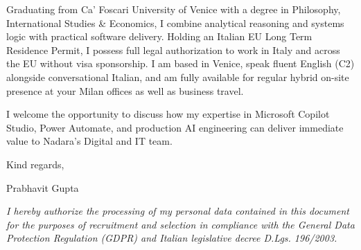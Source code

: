 \documentclass[10.5pt,a4paper]{article}
\begin{document}
Graduating from Ca' Foscari University of Venice with a degree in Philosophy, International Studies \& Economics, I combine analytical reasoning and systems logic with practical software delivery. Holding an Italian EU Long Term Residence Permit, I possess full legal authorization to work in Italy and across the EU without visa sponsorship. I am based in Venice, speak fluent English (C2) alongside conversational Italian, and am fully available for regular hybrid on-site presence at your Milan offices as well as business travel.

I welcome the opportunity to discuss how my expertise in Microsoft Copilot Studio, Power Automate, and production AI engineering can deliver immediate value to Nadara's Digital and IT team.

Kind regards,

Prabhavit Gupta

\vspace{0.4em}
{\footnotesize \textit{I hereby authorize the processing of my personal data contained in this document for the purposes of recruitment and selection in compliance with the General Data Protection Regulation (GDPR) and Italian legislative decree D.Lgs. 196/2003.}\par}
\end{document}
